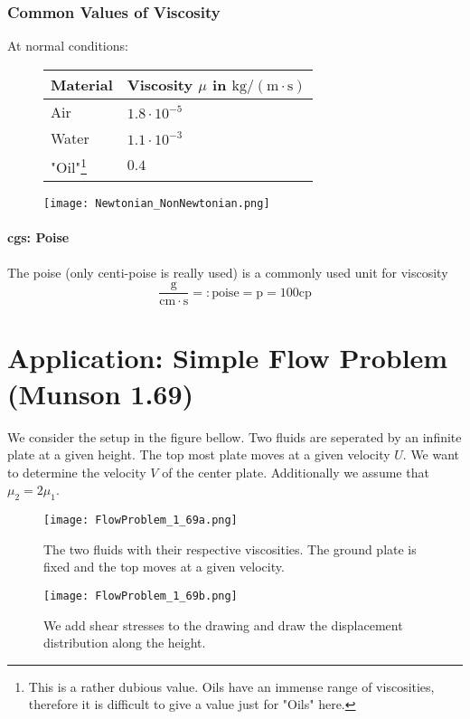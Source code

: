 \subsubsection{Common Values of Viscosity}
At normal conditions:
\begin{figure}[H]
    \begin{minipage}{0.45\textwidth}
        \centering
        \begin{tabular}{ll}
        \textbf{Material} & \textbf{Viscosity $\mu$ in $\mathrm{kg}/(\mathrm m\cdot \mathrm s)$}\\
        \hline
        Air      & $1.8\cdot 10^{-5}$                         \\
        \hline
        Water    & $1.1\cdot 10^{-3}$                          \\
        \hline
        "Oil"\footnote{This is a rather dubious value. Oils have an immense range of viscosities, therefore it is difficult to give a value just for "Oils" here.}    & $0.4$                       
        \end{tabular}
    \end{minipage}
    \hfill
    \begin{minipage}{0.45\textwidth}
        \centering
        \texttt{[image: Newtonian\_NonNewtonian.png]}

    \end{minipage}
\end{figure}

\paragraph{cgs: Poise}
The poise (only centi-poise is really used) is a commonly used unit for viscosity
$$
\frac{\mathrm g}{\mathrm{cm}\cdot\mathrm s} =: \mathrm{poise} = \mathrm p = 100 \mathrm{cp}
$$

\section{Application: Simple Flow Problem (Munson 1.69)}
We consider the setup in the figure bellow. Two fluids are seperated by an infinite plate at a given height. The top most plate moves at a given velocity $U$. We want to determine the velocity $V$ of the center plate. Additionally we assume that $\mu_2=2\mu_1$.

\begin{figure}[H]
    \begin{minipage}{0.45\textwidth}   
                \centering
            \texttt{[image: FlowProblem\_1\_69a.png]}
            \caption{The two fluids with their respective viscosities. The ground plate is fixed and the top moves at a given velocity.}            
    \end{minipage}
    \hfill
    \begin{minipage}{0.45\textwidth}
        \centering
        \texttt{[image: FlowProblem\_1\_69b.png]}
        \caption{We add shear stresses to the drawing and draw the displacement distribution along the height.}
    \end{minipage}
\end{figure}

